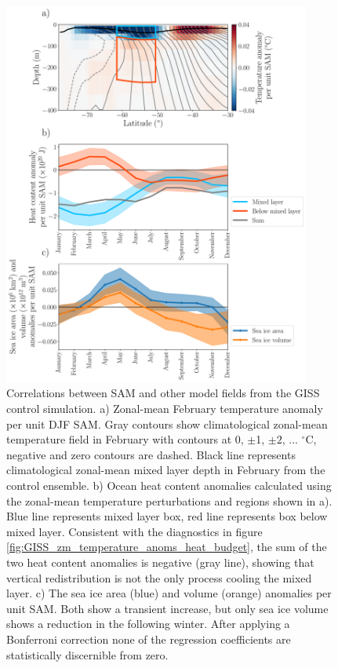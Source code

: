 \documentclass{ametsocV5}
\begin{document}
\begin{figure}[!ht]
    \begin{center}
        \includegraphics[width=0.9\textwidth]{figures/GISS_regression_OHC_anomalies_and_time_series.pdf}
        \caption{Correlations between SAM and other model fields from the GISS control simulation. a) Zonal-mean February temperature anomaly per unit DJF SAM. Gray contours show climatological zonal-mean temperature field in February with contours at 0, $\pm$1, $\pm2$, ... $^{\circ}$C, negative and zero contours are dashed. Black line represents climatological zonal-mean mixed layer depth in February from the control ensemble. b) Ocean heat content anomalies calculated using the zonal-mean temperature perturbations and regions shown in a). Blue line represents mixed layer box, red line represents box below mixed layer. Consistent with the diagnostics in figure \ref{fig:GISS_zm_temperature_anoms_heat_budget}, the sum of the two heat content anomalies is negative (gray line), showing that vertical redistribution is not the only process cooling the mixed layer. c) The sea ice area (blue) and volume (orange) anomalies per unit SAM. Both show a transient increase, but only sea ice volume shows a reduction in the following winter. After applying a Bonferroni correction none of the regression coefficients are statistically discernible from zero.}
        \label{fig:GISS_regression_OHC_anomalies_and_time_series}
    \end{center}
\end{figure}
\end{document}
